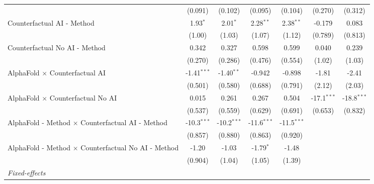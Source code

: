 \begin{tabular}{lcccccc}
                                                              & (0.091)       & (0.102)       & (0.095)       & (0.104)       & (0.270)       & (0.312)\\   
   Counterfactual AI - Method                                 & 1.93$^{*}$    & 2.01$^{*}$    & 2.28$^{**}$   & 2.38$^{**}$   & -0.179        & 0.083\\   
                                                              & (1.00)        & (1.03)        & (1.07)        & (1.12)        & (0.789)       & (0.813)\\   
   Counterfactual No AI - Method                              & 0.342         & 0.327         & 0.598         & 0.599         & 0.040         & 0.239\\   
                                                              & (0.270)       & (0.286)       & (0.476)       & (0.554)       & (1.02)        & (1.03)\\   
   AlphaFold $\times$ Counterfactual AI                       & -1.41$^{***}$ & -1.40$^{**}$  & -0.942        & -0.898        & -1.81         & -2.41\\   
                                                              & (0.501)       & (0.580)       & (0.688)       & (0.791)       & (2.12)        & (2.03)\\   
   AlphaFold $\times$ Counterfactual No AI                    & 0.015         & 0.261         & 0.267         & 0.504         & -17.1$^{***}$ & -18.8$^{***}$\\   
                                                              & (0.537)       & (0.559)       & (0.629)       & (0.691)       & (0.653)       & (0.832)\\   
   AlphaFold - Method $\times$ Counterfactual AI - Method     & -10.3$^{***}$ & -10.2$^{***}$ & -11.6$^{***}$ & -11.5$^{***}$ &               &   \\   
                                                              & (0.857)       & (0.880)       & (0.863)       & (0.920)       &               &   \\   
   AlphaFold - Method $\times$ Counterfactual No AI - Method  & -1.20         & -1.03         & -1.79$^{*}$   & -1.48         &               &   \\   
                                                              & (0.904)       & (1.04)        & (1.05)        & (1.39)        &               &   \\   
   \midrule
   \emph{Fixed-effects}\\

\end{tabular}
